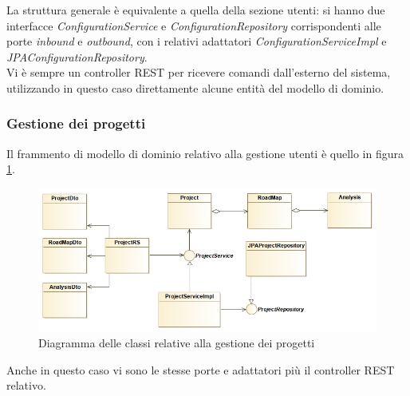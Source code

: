La struttura generale è equivalente a quella della sezione utenti: si hanno due interfacce \textit{ConfigurationService} e \textit{ConfigurationRepository} corrispondenti alle porte \textit{inbound} e \textit{outbound}, con i relativi adattatori \textit{ConfigurationServiceImpl} e \textit{JPAConfigurationRepository}.\\
Vi è sempre un controller REST per ricevere comandi dall'esterno del sistema, utilizzando in questo caso direttamente alcune entità del modello di dominio.

\subsubsection{Gestione dei progetti}
Il frammento di modello di dominio relativo alla gestione utenti è quello in figura \ref{fig:projects_diagram}.

\begin{figure}[h]
	\centering
	\includegraphics[width=\textwidth]{img/projects_diagram}
	\caption{Diagramma delle classi relative alla gestione dei progetti}
	\label{fig:projects_diagram}
\end{figure}

Anche in questo caso vi sono le stesse porte e adattatori più il controller REST relativo.
